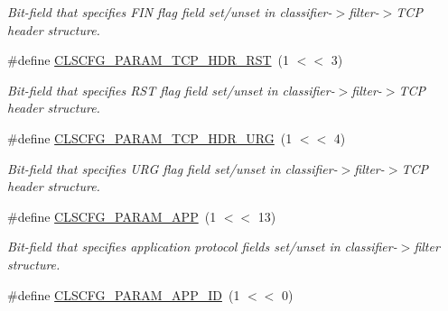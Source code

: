 \begin{DoxyCompactItemize}
\begin{DoxyCompactList}\small\item\em Bit-\/field that specifies F\-I\-N flag field set/unset in classifier-\/$>$filter-\/$>$T\-C\-P header structure. \end{DoxyCompactList}\item 
\hypertarget{group__FAPI__QOS__CLASS_gaee769ff0e4ed6f075f9460c5db38f584}{\#define \hyperlink{group__FAPI__QOS__CLASS_gaee769ff0e4ed6f075f9460c5db38f584}{C\-L\-S\-C\-F\-G\-\_\-\-P\-A\-R\-A\-M\-\_\-\-T\-C\-P\-\_\-\-H\-D\-R\-\_\-\-R\-S\-T}~(1 $<$$<$ 3)}\label{group__FAPI__QOS__CLASS_gaee769ff0e4ed6f075f9460c5db38f584}

\begin{DoxyCompactList}\small\item\em Bit-\/field that specifies R\-S\-T flag field set/unset in classifier-\/$>$filter-\/$>$T\-C\-P header structure. \end{DoxyCompactList}\item 
\hypertarget{group__FAPI__QOS__CLASS_ga15b580e26fcf1b37d7f8fba283801d09}{\#define \hyperlink{group__FAPI__QOS__CLASS_ga15b580e26fcf1b37d7f8fba283801d09}{C\-L\-S\-C\-F\-G\-\_\-\-P\-A\-R\-A\-M\-\_\-\-T\-C\-P\-\_\-\-H\-D\-R\-\_\-\-U\-R\-G}~(1 $<$$<$ 4)}\label{group__FAPI__QOS__CLASS_ga15b580e26fcf1b37d7f8fba283801d09}

\begin{DoxyCompactList}\small\item\em Bit-\/field that specifies U\-R\-G flag field set/unset in classifier-\/$>$filter-\/$>$T\-C\-P header structure. \end{DoxyCompactList}\item 
\hypertarget{group__FAPI__QOS__CLASS_ga6789c1000de15696d7e77f558f139bc5}{\#define \hyperlink{group__FAPI__QOS__CLASS_ga6789c1000de15696d7e77f558f139bc5}{C\-L\-S\-C\-F\-G\-\_\-\-P\-A\-R\-A\-M\-\_\-\-A\-P\-P}~(1 $<$$<$ 13)}\label{group__FAPI__QOS__CLASS_ga6789c1000de15696d7e77f558f139bc5}

\begin{DoxyCompactList}\small\item\em Bit-\/field that specifies application protocol fields set/unset in classifier-\/$>$filter structure. \end{DoxyCompactList}\item 
\hypertarget{group__FAPI__QOS__CLASS_gaa368194c8a40c03f937855657fdddd06}{\#define \hyperlink{group__FAPI__QOS__CLASS_gaa368194c8a40c03f937855657fdddd06}{C\-L\-S\-C\-F\-G\-\_\-\-P\-A\-R\-A\-M\-\_\-\-A\-P\-P\-\_\-\-I\-D}~(1 $<$$<$ 0)}\label{group__FAPI__QOS__CLASS_gaa368194c8a40c03f937855657fdddd06}


\end{DoxyCompactItemize}
